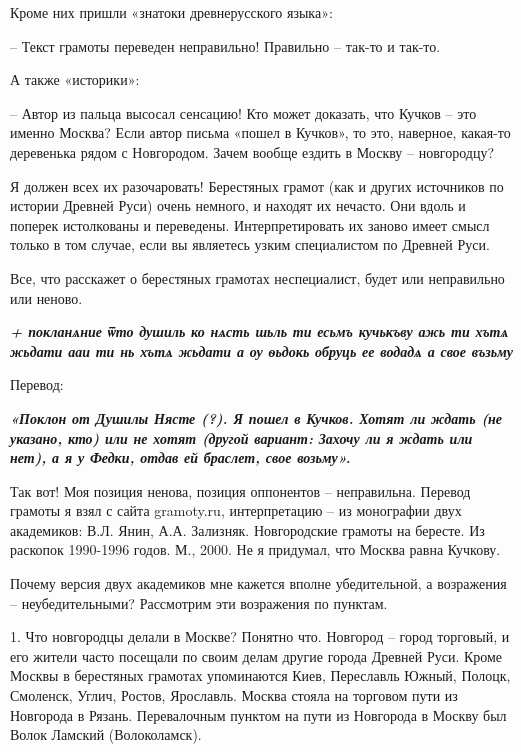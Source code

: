 Кроме них пришли «знатоки древнерусского языка»:

– Текст грамоты переведен неправильно! Правильно – так-то и так-то.

А также «историки»:

– Автор из пальца высосал сенсацию! Кто может доказать, что Кучков – это именно
Москва? Если автор письма «пошел в Кучков», то это, наверное, какая-то
деревенька рядом с Новгородом. Зачем вообще ездить в Москву – новгородцу?

Я должен всех их разочаровать! Берестяных грамот (как и других источников по
истории Древней Руси) очень немного, и находят их нечасто. Они вдоль и поперек
истолкованы и переведены. Интерпретировать их заново имеет смысл только в том
случае, если вы являетесь узким специалистом по Древней Руси.

Все, что расскажет о берестяных грамотах неспециалист, будет или неправильно
или неново.

\begin{leftbar}
  \begingroup
    \em\Large\bfseries\color{blue}
		+ покланѧние ѿто душиль ко нѧсть шьль ти есьмъ кучькъву ажь ти хътѧ жьдати
				ааи ти нь хътѧ жьдати а оу ѳьдокь обруць ее водадѧ а свое възьму
  \endgroup
\end{leftbar}

Перевод:

\begin{leftbar}
  \begingroup
		\em\Large\bfseries\color{blue} «Поклон от Душилы Нясте (?). Я пошел в
				Кучков. Хотят ли ждать (не указано, кто) или не хотят (другой вариант:
				Захочу ли я ждать или нет), а я у Федки, отдав ей браслет, свое
				возьму».
  \endgroup
\end{leftbar}

Так вот! Моя позиция ненова, позиция оппонентов – неправильна. Перевод грамоты
я взял с сайта gramoty.ru, интерпретацию – из монографии двух академиков: В.Л.
Янин, А.А. Зализняк. Новгородские грамоты на бересте. Из раскопок 1990-1996
годов. М., 2000. Не я придумал, что Москва равна Кучкову.

Почему версия двух академиков мне кажется вполне убедительной, а возражения –
неубедительными? Рассмотрим эти возражения по пунктам.

1. Что новгородцы делали в Москве? Понятно что. Новгород – город торговый, и
его жители часто посещали по своим делам другие города Древней Руси. Кроме
Москвы в берестяных грамотах упоминаются Киев, Переславль Южный, Полоцк,
Смоленск, Углич, Ростов, Ярославль. Москва стояла на торговом пути из Новгорода
в Рязань. Перевалочным пунктом на пути из Новгорода в Москву был Волок Ламский
(Волоколамск).

